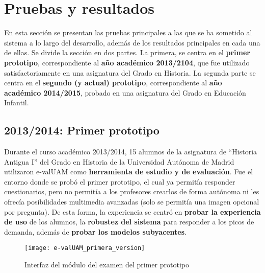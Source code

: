 \chapter{Pruebas y resultados\label{sec:pruebasYResultados}}

En esta sección se presentan las pruebas principales a las que se ha sometido al sistema a lo largo del desarrollo, además de los resultados principales en cada una de ellas. Se divide la sección en dos partes. La primera, se centra en el \textbf{primer prototipo}, correspondiente al \textbf{año académico 2013/2104}, que fue utilizado satisfactoriamente en una asignatura del Grado en Historia. La segunda parte se centra en el \textbf{segundo (y actual) prototipo}, correspondiente al \textbf{año académico 2014/2015}, probado en una asignatura del Grado en Educación Infantil.


\section{2013/2014: Primer prototipo}


Durante el curso académico 2013/2014, 15 alumnos de la asignatura de ``Historia Antigua I'' del Grado en Historia de la Universidad Autónoma de Madrid utilizaron \acrshort{e-valUAM} como \textbf{herramienta de estudio y de evaluación}. Fue el entorno donde se probó el primer prototipo, el cual ya permitía responder cuestionarios, pero no permitía a los profesores crearlos de forma autónoma ni les ofrecía posibilidades multimedia avanzadas (solo se permitía una imagen opcional por pregunta). De esta forma, la experiencia se centró en \textbf{probar la experiencia de uso} de los alumnos, la \textbf{robustez del sistema} para responder a los picos de demanda, además de \textbf{probar los modelos subyacentes}.

\begin{figure}[htp!]
	\centering
	\texttt{[image: e-valUAM\_primera\_version]}
	\caption{Interfaz del módulo del examen del primer prototipo}
	\label{fig:e-valUAM primera version}
\end{figure}

